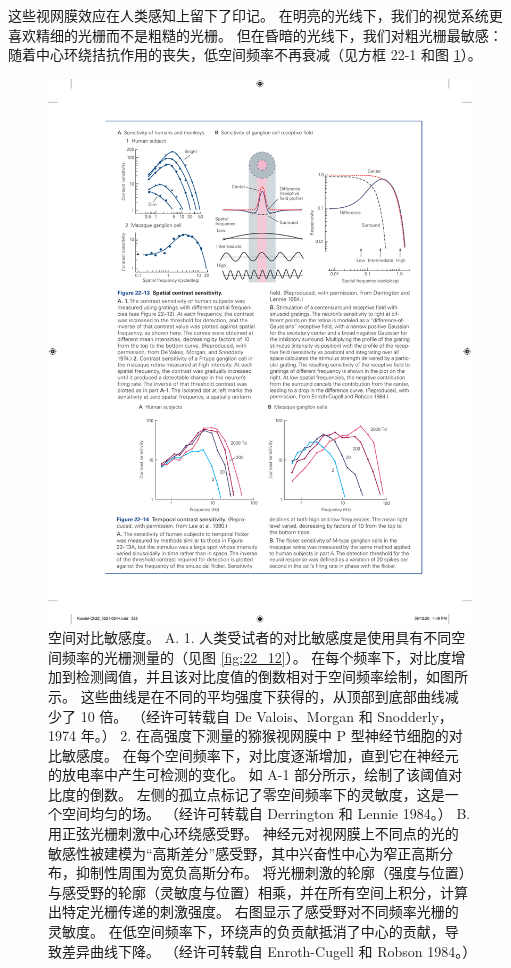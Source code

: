 这些视网膜效应在人类感知上留下了印记。 
在明亮的光线下，我们的视觉系统更喜欢精细的光栅而不是粗糙的光栅。 
但在昏暗的光线下，我们对粗光栅最敏感：随着中心环绕拮抗作用的丧失，低空间频率不再衰减（见方框 22-1 和图 \ref{fig:22_13}）。

\begin{figure}[htbp]
	\centering
	\includegraphics[width=1.0\linewidth]{chap22/fig_22_13}
	\caption{空间对比敏感度。 
		A. 1. 人类受试者的对比敏感度是使用具有不同空间频率的光栅测量的（见图 \ref{fig:22_12}）。 
		在每个频率下，对比度增加到检测阈值，并且该对比度值的倒数相对于空间频率绘制，如图所示。 
		这些曲线是在不同的平均强度下获得的，从顶部到底部曲线减少了 10 倍。 （经许可转载自 De Valois、Morgan 和 Snodderly，1974 年。） 
		2. 在高强度下测量的猕猴视网膜中 P 型神经节细胞的对比敏感度。 
		在每个空间频率下，对比度逐渐增加，直到它在神经元的放电率中产生可检测的变化。
		如 A-1 部分所示，绘制了该阈值对比度的倒数。 
		左侧的孤立点标记了零空间频率下的灵敏度，这是一个空间均匀的场。 （经许可转载自 Derrington 和 Lennie 1984。） 
		B. 用正弦光栅刺激中心环绕感受野。 神经元对视网膜上不同点的光的敏感性被建模为“高斯差分”感受野，其中兴奋性中心为窄正高斯分布，抑制性周围为宽负高斯分布。 将光栅刺激的轮廓（强度与位置）与感受野的轮廓（灵敏度与位置）相乘，并在所有空间上积分，计算出特定光栅传递的刺激强度。 
		右图显示了感受野对不同频率光栅的灵敏度。 在低空间频率下，环绕声的负贡献抵消了中心的贡献，导致差异曲线下降。 （经许可转载自 Enroth-Cugell 和 Robson 1984。）}
	\label{fig:22_13}
\end{figure}

